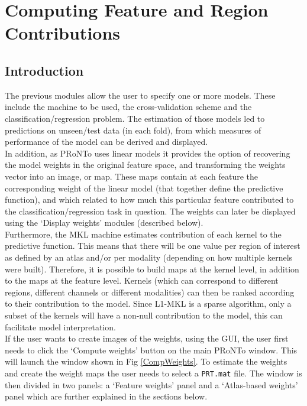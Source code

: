 
\chapter{Computing Feature and Region Contributions}
\label{chap:ComputeWeights}

\minitoc

\section{Introduction}

The previous modules allow the user to specify one or more models. These include the machine to be used, the cross-validation scheme and the classification/regression problem. The estimation of those models led to predictions on unseen/test data (in each fold), from which measures of performance of the model can be derived and displayed.
\\

In addition, as PRoNTo uses linear models it provides the option of recovering the model weights in the original feature space, and transforming the weights vector into an image, or map. These maps contain at each feature the corresponding weight of the linear model (that together define the predictive function), and which related to how much this particular feature contributed to the classification/regression task in question. The weights can later be displayed using the `Display weights' modules (described below).
\\

Furthermore, the MKL machine estimates contribution of each kernel to the predictive function. This means that there will be one value per region of interest as defined by an atlas and/or per modality (depending on how multiple kernels were built). Therefore, it is possible to build maps at the kernel level, in addition to the maps at the feature level. Kernels (which can correspond to different regions, different channels or different modalities) can then be ranked according to their contribution to the model. Since L1-MKL is a sparse algorithm, only a subset of the kernels will have a non-null contribution to the model, this can facilitate model interpretation.
\\

If the user wants to create images of the weights, using the GUI, the user first needs to click the `Compute weights' button on the main PRoNTo window. This will launch the window shown in Fig \ref{CompWeights}. To estimate the weights and create the weight maps the user needs to select a {\tt PRT.mat} file. The window is then divided in two panels: a `Feature weights' panel and a `Atlas-based weights' panel which are further explained in the sections below.
\\[1cm]

